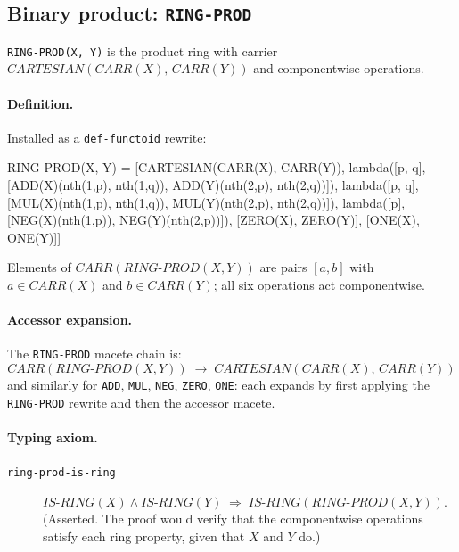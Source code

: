 \subsection{Binary product: \texttt{RING-PROD}}

\texttt{RING-PROD(X,~Y)} is the product ring with carrier
$\mathit{CARTESIAN}(\mathit{CARR}(X),\,\mathit{CARR}(Y))$ and
componentwise operations.

\paragraph{Definition.}
Installed as a \texttt{def-functoid} rewrite:

\begin{VNBsnip}
RING-PROD(X, Y) =
  [CARTESIAN(CARR(X), CARR(Y)),
   lambda([p, q], [ADD(X)(nth(1,p), nth(1,q)),
                   ADD(Y)(nth(2,p), nth(2,q))]),
   lambda([p, q], [MUL(X)(nth(1,p), nth(1,q)),
                   MUL(Y)(nth(2,p), nth(2,q))]),
   lambda([p],    [NEG(X)(nth(1,p)),
                   NEG(Y)(nth(2,p))]),
   [ZERO(X), ZERO(Y)],
   [ONE(X),  ONE(Y)]]
\end{VNBsnip}

Elements of $\mathit{CARR}(\mathit{RING\text{-}PROD}(X,Y))$ are pairs $[a,b]$
with $a \in \mathit{CARR}(X)$ and $b \in \mathit{CARR}(Y)$;
all six operations act componentwise.

\paragraph{Accessor expansion.}
The \texttt{RING-PROD} macete chain is:
\[
  \mathit{CARR}(\mathit{RING\text{-}PROD}(X,Y))
  \;\longrightarrow\; \mathit{CARTESIAN}(\mathit{CARR}(X),\,\mathit{CARR}(Y))
\]
and similarly for \texttt{ADD}, \texttt{MUL}, \texttt{NEG}, \texttt{ZERO},
\texttt{ONE}: each expands by first applying the \texttt{RING-PROD}
rewrite and then the accessor macete.

\paragraph{Typing axiom.}
\begin{description}
\item[\texttt{ring-prod-is-ring}]
  $\mathit{IS\text{-}RING}(X) \wedge \mathit{IS\text{-}RING}(Y)
  \;\Rightarrow\; \mathit{IS\text{-}RING}(\mathit{RING\text{-}PROD}(X,Y))$.
  (Asserted.  The proof would verify that the componentwise
  operations satisfy each ring property, given that $X$ and $Y$ do.)
\end{description}


